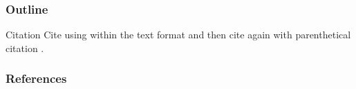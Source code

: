 \documentclass{beamer}
\theoremstyle{mystyle}
\begin{document}
\begin{frame}
	\frametitle{Outline}
	\tableofcontents[currentsection]
\end{frame}

\begin{frame}{Citation}
Cite \citet{einstein1935can} using within the text format and then cite again with parenthetical citation \citep{kingma2014adam}.

\end{frame}

\begin{frame}[allowframebreaks]
	\frametitle{References}
	
	{\footnotesize
	}
\end{frame}
\end{document}
